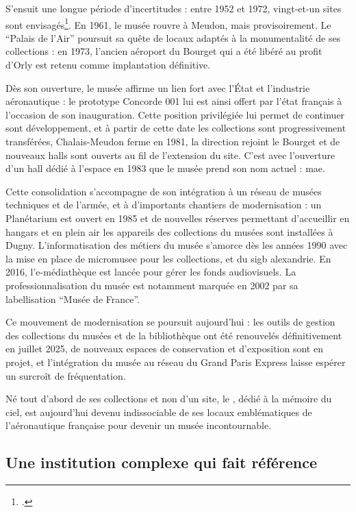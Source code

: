 S'ensuit une longue période d'incertitudes : entre 1952 et 1972, vingt-et-un sites sont envisagés\footcite{terrierAeroportParisBourget2019}. En 1961, le musée rouvre à Meudon, mais provisoirement. Le \enquote{Palais de l'Air} poursuit sa quête de locaux adaptés à la monumentalité de ses collections : en 1973, l'ancien aéroport du Bourget qui a été libéré au profit d'Orly est retenu comme implantation définitive.

Dès son ouverture, le musée affirme un lien fort avec l’État et l’industrie aéronautique : le prototype Concorde 001 lui est ainsi offert par l'état français à l'occasion de son inauguration. Cette position privilégiée lui permet de continuer sont développement, et à partir de cette date les collections sont progressivement transférées, Chalais-Meudon ferme en 1981, la direction rejoint le Bourget et de nouveaux halls sont ouverts au fil de l’extension du site. C'est avec l'ouverture d'un hall dédié à l'espace en 1983 que le musée prend son nom actuel : \acf{mae}.

Cette consolidation s’accompagne de son intégration à un réseau de musées techniques et de l'armée, et à d'importants chantiers de modernisation : un Planétarium est ouvert en 1985 et de nouvelles réserves permettant d'accueillir en hangars et en plein air les appareils des collections du musées sont installées à Dugny. L'informatisation des métiers du musée s'amorce dès les années 1990 avec la mise en place de \gls{micromusee} pour les collections, et du \ac{sigb} \gls{alexandrie}. En 2016, l’e-médiathèque est lancée pour gérer les fonds audiovisuels. La professionnalisation du musée est notamment marquée en 2002 par sa labellisation \enquote{Musée de France}. 

Ce mouvement de modernisation se poursuit aujourd’hui : les outils de gestion des collections du musées et de la bibliothèque ont été renouvelés définitivement en juillet 2025, de nouveaux espaces de conservation et d’exposition sont en projet, et l'intégration du musée au réseau du Grand Paris Express laisse espérer un surcroît de fréquentation.

Né tout d'abord de ses collections et non d'un site, le \mae, dédié à la mémoire du ciel, est aujourd'hui devenu indissociable de ses locaux emblématiques de l'aéronautique française pour devenir un musée incontournable.

\subsection{Une institution complexe qui fait référence}

